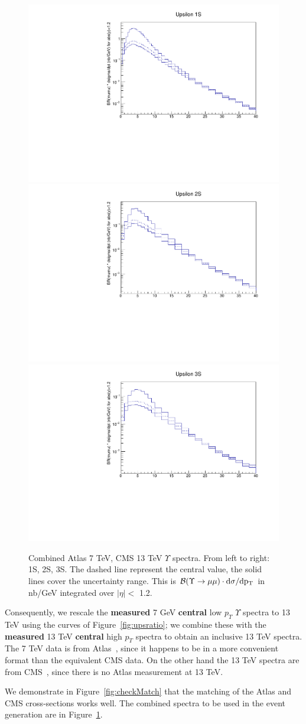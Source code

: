 \documentclass[12pt]{article}
\begin{document}
\begin{figure}
\begin{adjustwidth}{-2cm}{-2cm}
\centering
\includegraphics[width=0.32\linewidth]{../oniaDirect/upsilon/ups1s-full.pdf}
\includegraphics[width=0.32\linewidth]{../oniaDirect/upsilon/ups2s-full.pdf}
\includegraphics[width=0.32\linewidth]{../oniaDirect/upsilon/ups3s-full.pdf}
\end{adjustwidth}
\caption{\protect Combined Atlas 7 TeV, CMS 13 TeV $\Upsilon$ spectra.
  From left to right: 1S, 2S, 3S. 
The dashed line represent the central value, the solid
  lines cover the uncertainty range.  This is ${\cal B}(\Upsilon \to \mu\mu) \cdot
  \rm{d}\sigma/\rm{d}p_T$ in nb/GeV integrated
  over $|\eta| <$ 1.2.}
\label{fig:upsFinal}
\end{figure}

  
Consequently,  we rescale the {\bf measured} 7 GeV {\bf central} low
$p_T$ $\Upsilon$ spectra to 13 TeV using the curves of
Figure~\ref{fig:upsratio};  we combine these with the {\bf measured} 13 TeV 
  {\bf central} high $p_T$ spectra to obtain an inclusive 13 TeV spectra.  The 7 TeV data
  is from Atlas~\cite{Aad:2012dlq}, since it happens to be in a more
  convenient format than the equivalent CMS data.
On the other hand the 13 TeV spectra are from
  CMS~\cite{Sirunyan:2017qdw}, since there is no Atlas measurement at
  13 TeV.

We demonstrate in Figure~\ref{fig:checkMatch} that the
  matching of the Atlas and CMS cross-sections works well.  The combined
  spectra to be used in the event generation are in Figure~\ref{fig:upsFinal}.
\end{document}
